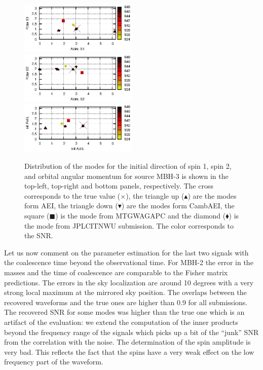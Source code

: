 \documentclass{iopart}
\begin{document}
\begin{figure}
\includegraphics[width=0.5\textwidth, clip=true, viewport=0 4 198 83 ]{DirS1_srcMC2_SNR.eps}
\includegraphics[width=0.5\textwidth, clip=true, viewport=0 4 198 83 ]{DirS2_srcMC2_SNR.eps}\\
\center \includegraphics[width=0.5\textwidth, clip=true, viewport=0 4 198 83 ]{DirL_srcMC2_SNR.eps}
\caption{Distribution of the modes for the initial direction of spin 1, spin 2, and orbital angular momentum for source MBH-3 is shown in the top-left, top-right and bottom panels, respectively. The cross corresponds to the true value ($\times$), the triangle up ($\blacktriangle$) are the modes form AEI, the triangle down ($\blacktriangledown$) are the modes form CambAEI, the square ($\blacksquare$) is the mode from MTGWAGAPC and the diamond ($\blacklozenge$) is the mode from JPLCITNWU submission. The color corresponds to the SNR.
\label{fig:SMBH_spinLdeg}}
\end{figure}


Let us now comment on the parameter estimation for the last two signals with the coalescence time beyond the observational time. For MBH-2 the error in the masses and the time of coalescence are comparable to the Fisher matrix predictions. 
The errors in the sky localization are around 10 degrees with a very strong local maximum at the mirrored 
sky position. The overlaps between the recovered waveforms and the true ones are higher than 0.9 for all submissions.
The recovered SNR for some modes was higher than the true one which is an artifact of the evaluation: 
we extend the computation of the inner products beyond the frequency range of the signals which picks up a bit of the 
``junk'' SNR from the correlation with the noise. 
%
The determination of the spin amplitude is very bad. This reflects the fact that the spins have a very weak effect on the low frequency part of the waveform. 
\end{document}
